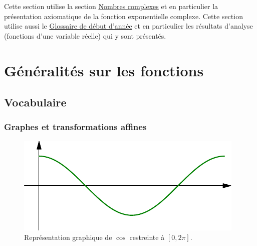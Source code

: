 

Cette section utilise la section \href{\baseurl C2002.pdf}{Nombres complexes} et en particulier la présentation axiomatique de la fonction exponentielle complexe. Cette section utilise aussi le \href{\baseurl C4199.pdf}{Glossaire de début d'année} et en particulier les résultats d'analyse (fonctions d'une variable réelle) qui y sont présentés.

\section{Généralités sur les fonctions}
\subsection{Vocabulaire}
\subsubsection{Graphes et transformations affines}
\begin{figure}[h]
 \centering
 \includegraphics{./C2004_graph1.pdf}
 \caption{Représentation graphique de $\cos$ restreinte à $\left[0 , 2\pi \right]$.}
 \label{fig:graph1}
\end{figure}

